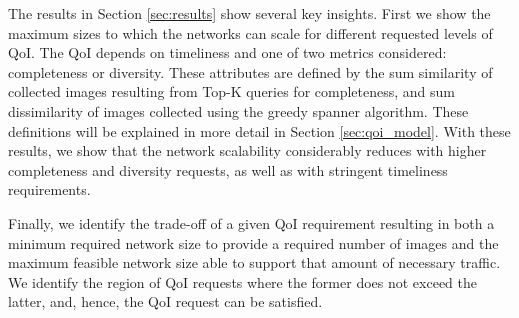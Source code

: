 The results in Section \ref{sec:results} show several key insights.  First we show the maximum sizes to which the networks can scale for different requested levels of QoI. The QoI depends on timeliness and one of two metrics considered: completeness or diversity.  These attributes are defined by the sum similarity of collected images resulting from Top-K queries for completeness, and sum dissimilarity of images collected using the greedy spanner algorithm.  These definitions will be explained in more detail in Section \ref{sec:qoi_model}.  With these results, we show that the network scalability considerably reduces with higher completeness and diversity requests, as well as with stringent timeliness requirements.  

Finally, we identify the trade-off of a given QoI requirement resulting in both a minimum required network size to provide a required number of images and the maximum feasible network size able to support that amount of necessary traffic.  We identify the region of QoI requests where the former does not exceed the latter, and, hence, the QoI request can be satisfied. 

